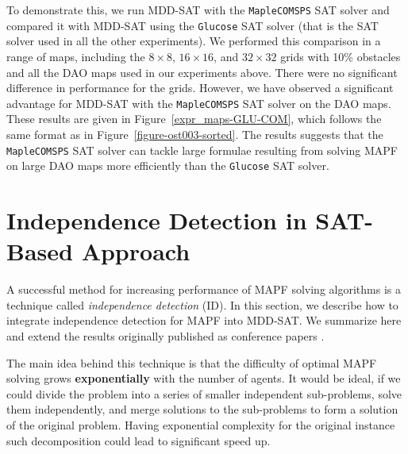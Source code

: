 \documentclass[jair,oneside,11pt]{article}
\begin{document}
To demonstrate this, we run MDD-SAT with the \texttt{MapleCOMSPS} SAT solver and compared it with MDD-SAT using the \texttt{Glucose} SAT solver (that is the SAT solver used in all the other experiments). We performed this comparison in a range of maps, including the $8{}\times{}8$, $16{}\times{}16$, and $32{}\times{}32$ grids with 10\% obstacles and all the DAO maps used in our experiments above. There were no significant difference in performance for the grids. However, we have observed a significant advantage for MDD-SAT with the \texttt{MapleCOMSPS} SAT solver on the DAO maps. These results are given in Figure~\ref{expr_maps-GLU-COM}, which follows the same format as in Figure~\ref{figure-ost003-sorted}. The results suggests that the \texttt{MapleCOMSPS} SAT solver can tackle large formulae resulting from solving MAPF on large DAO maps more efficiently than the \texttt{Glucose} SAT solver.



\section{Independence Detection in SAT-Based Approach}

A successful method for increasing performance of MAPF solving algorithms is a technique called {\em independence detection} (ID). In this section, we describe how to integrate independence detection for MAPF \cite{DBLP:conf/aaai/Standley10,DBLP:conf/ijcai/StandleyK11} into MDD-SAT. We summarize here and extend the results originally published as conference papers \cite{DBLP:conf/icaart/SurynekSFB17,DBLP:conf/icaart/SurynekSFB17a}.

The main idea behind this technique is that the difficulty of optimal MAPF solving grows {\bf exponentially} with the number of agents. It would be ideal, if we could divide the problem into a series of smaller independent sub-problems, solve them independently, and merge solutions to the sub-problems to form a solution of the original problem. Having exponential complexity for the original instance such decomposition could lead to significant speed up.
\end{document}
